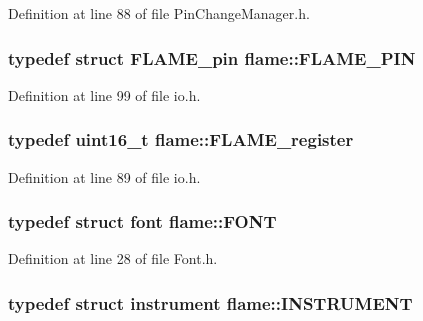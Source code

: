 Definition at line 88 of file Pin\-Change\-Manager.\-h.

\hypertarget{namespaceflame_ae345f4de995f89125721dd4f5cd4cd9f}{
\subsubsection[{F\-L\-A\-M\-E\-\_\-\-P\-I\-N}]{\setlength{\rightskip}{0pt plus 5cm}typedef struct {\bf F\-L\-A\-M\-E\-\_\-pin} {\bf flame\-::\-F\-L\-A\-M\-E\-\_\-\-P\-I\-N}}}\label{namespaceflame_ae345f4de995f89125721dd4f5cd4cd9f}


Definition at line 99 of file io.\-h.

\hypertarget{namespaceflame_a7117d3cded694c1ded03c462d677b165}{
\subsubsection[{F\-L\-A\-M\-E\-\_\-register}]{\setlength{\rightskip}{0pt plus 5cm}typedef uint16\-\_\-t {\bf flame\-::\-F\-L\-A\-M\-E\-\_\-register}}}\label{namespaceflame_a7117d3cded694c1ded03c462d677b165}


Definition at line 89 of file io.\-h.

\hypertarget{namespaceflame_a05350b61d7b7be486d5e367522316a33}{
\subsubsection[{F\-O\-N\-T}]{\setlength{\rightskip}{0pt plus 5cm}typedef struct {\bf font} {\bf flame\-::\-F\-O\-N\-T}}}\label{namespaceflame_a05350b61d7b7be486d5e367522316a33}


Definition at line 28 of file Font.\-h.

\hypertarget{namespaceflame_a7f0c5adbd1329cd2947d15e6af02dbf1}{
\subsubsection[{I\-N\-S\-T\-R\-U\-M\-E\-N\-T}]{\setlength{\rightskip}{0pt plus 5cm}typedef struct {\bf instrument} {\bf flame\-::\-I\-N\-S\-T\-R\-U\-M\-E\-N\-T}}}\label{namespaceflame_a7f0c5adbd1329cd2947d15e6af02dbf1}


